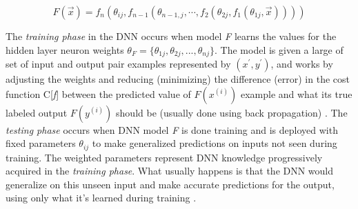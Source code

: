 \documentclass[grad,lot,lof,11pt,oneside,onehalfspace]{RUthesis}
\begin{document}
\[F(\vec{x})=f_{n}(\theta_{ij}, f_{n - 1}(\theta_{n - 1,j}, \cdots, f_{2}(\theta_{2j}, f_{1}(\theta_{1j}, \vec{x})))) \]

The \textit{training phase} in the DNN occurs when model \textit{F} learns the values for the hidden layer neuron weights $\theta_{F} =  \{\theta_{1j}, \theta_{2j},...,\theta_{nj}\}$. The model is given a large of set of input and output pair examples represented by $({x^{'}}, {y^{'}})$, and works
by adjusting the weights and reducing (minimizing) the difference (error) in the cost function C[\textit{f}] between the predicted value of \textit{$F(x^{(i)})$} example and what its true labeled  output \textit{$F(y^{(i)})$} should be (usually done using back propagation) \cite{papernot_practical_2017}. The \textit{testing phase} occurs when DNN model \textit{F} is done training and is deployed with fixed parameters $\theta_{ij}$ to make generalized predictions on inputs not seen during training. The weighted parameters represent DNN knowledge progressively acquired in the \textit{training phase}. What usually happens is that the DNN would generalize on this unseen input and make accurate predictions for the output, using only what it's learned during training \cite{papernot_practical_2017}.
\end{document}
